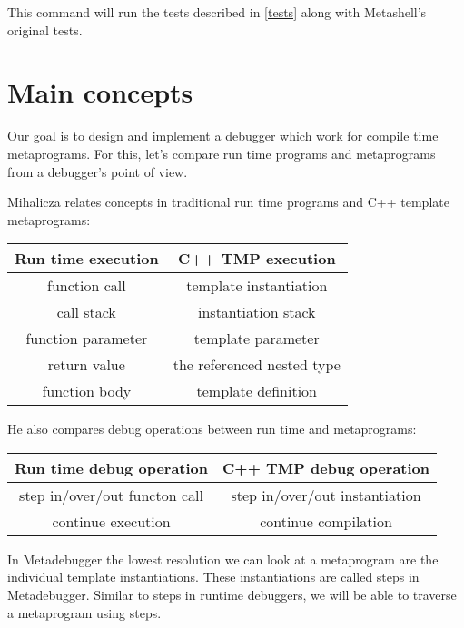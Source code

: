 This command will run the tests described in \ref{tests} along with Metashell's
original tests.

\section{Main concepts}

Our goal is to design and implement a debugger which work for compile time
metaprograms. For this, let's compare run time programs and metaprograms from a
debugger's point of view.

Mihalicza relates concepts in traditional run time programs and C++ template
metaprograms\cite{mihalicza-phd}:

\begin{center}
    \begin{tabular}{| c | c |}
        \hline
        Run time execution & C++ TMP execution \\ \hline \hline
        function call & template instantiation \\ \hline
        call stack & instantiation stack \\ \hline
        function parameter & template parameter \\ \hline
        return value & the referenced nested type \\ \hline
        function body & template definition \\ \hline
    \end{tabular}
\end{center}

He also compares debug operations between run time and metaprograms:

\begin{center}
    \begin{tabular}{| c | c |}
        \hline
        Run time debug operation & C++ TMP debug operation \\ \hline \hline
        step in/over/out functon call & step in/over/out instantiation \\ \hline
        continue execution & continue compilation \\ \hline
    \end{tabular}
\end{center}


In Metadebugger the lowest resolution we can look at a metaprogram are the
individual template instantiations. These instantiations are called steps in
Metadebugger. Similar to steps in runtime debuggers, we will be able to
traverse a metaprogram using steps.

